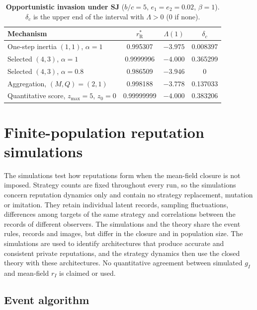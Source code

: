 \documentclass[10pt]{wlscirep}
\newcommand{\rR}{r_{\mathrm{R}}^{*}}
\theoremstyle{plain}
\theoremstyle{remark}
\begin{document}
\begin{table}[!htbp]
\centering
\caption{\textbf{Opportunistic invasion under SJ} ($b/c=5$, $e_1=e_2=0.02$, $\beta=1$). $\delta_c$ is the upper end of the interval with $\Lambda>0$ (0 if none).}
\label{tab:si-filters}
\small
\begin{tabular}{@{}lccc@{}}
\toprule
Mechanism & $\rR$ & $\Lambda(1)$ & $\delta_c$\\
\midrule
One-step inertia $(1,1)$, $\alpha=1$ & 0.995307 & $-3.975$ & 0.008397\\
Selected $(4,3)$, $\alpha=1$ & 0.9999996 & $-4.000$ & 0.365299\\
Selected $(4,3)$, $\alpha=0.8$ & 0.986509 & $-3.946$ & 0\\
Aggregation, $(M,Q)=(2,1)$ & 0.998188 & $-3.778$ & 0.137033\\
Quantitative score, $z_{\max}=5$, $z_0=0$ & 0.99999999 & $-4.000$ & 0.383206\\
\bottomrule
\end{tabular}
\end{table}

\FloatBarrier
\section{Finite-population reputation simulations}
\label{si:simulations}

The simulations test how reputations form when the mean-field closure is not imposed. Strategy counts are fixed throughout every run, so the simulations concern reputation dynamics only and contain no strategy replacement, mutation or imitation. They retain individual latent records, sampling fluctuations, differences among targets of the same strategy and correlations between the records of different observers. The simulations and the theory share the event rules, records and images, but differ in the closure and in population size. The simulations are used to identify architectures that produce accurate and consistent private reputations, and the strategy dynamics then use the closed theory with these architectures. No quantitative agreement between simulated $g_I$ and mean-field $r_I$ is claimed or used.

\subsection{Event algorithm}
\end{document}
